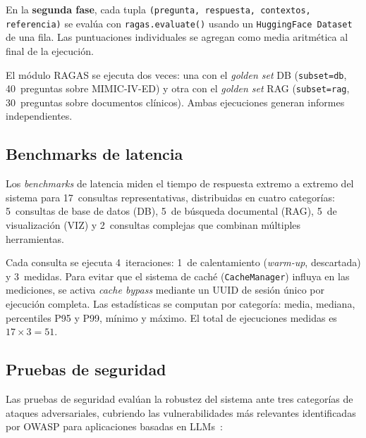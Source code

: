 En la \textbf{segunda fase}, cada tupla \texttt{(pregunta, respuesta, contextos, referencia)} se evalúa con \texttt{ragas.evaluate()} usando un \texttt{HuggingFace Dataset} de una fila. Las puntuaciones individuales se agregan como media aritmética al final de la ejecución.

El módulo \ac{RAGAS} se ejecuta dos veces: una con el \textit{golden set} DB (\texttt{subset=db}, 40~preguntas sobre \acs{MIMIC}-IV-\acs{ED}) y otra con el \textit{golden set} \ac{RAG} (\texttt{subset=rag}, 30~preguntas sobre documentos clínicos). Ambas ejecuciones generan informes independientes.


\subsection{Benchmarks de latencia}
\label{subsec:metodologia_latencia}

Los \textit{benchmarks} de latencia miden el tiempo de respuesta extremo a extremo del sistema para 17~consultas representativas, distribuidas en cuatro categorías: 5~consultas de base de datos (DB), 5~de búsqueda documental (\ac{RAG}), 5~de visualización (VIZ) y 2~consultas complejas que combinan múltiples herramientas.

Cada consulta se ejecuta 4~iteraciones: 1~de calentamiento (\textit{warm-up}, descartada) y 3~medidas. Para evitar que el sistema de caché (\texttt{CacheManager}) influya en las mediciones, se activa \textit{cache bypass} mediante un UUID de sesión único por ejecución completa. Las estadísticas se computan por categoría: media, mediana, percentiles P95 y P99, mínimo y máximo. El total de ejecuciones medidas es $17 \times 3 = 51$.


\subsection{Pruebas de seguridad}
\label{subsec:metodologia_seguridad}

Las pruebas de seguridad evalúan la robustez del sistema ante tres categorías de ataques adversariales, cubriendo las vulnerabilidades más relevantes identificadas por \ac{OWASP} para aplicaciones basadas en \ac{LLM}s~\parencite{OWASP2023llm}:

